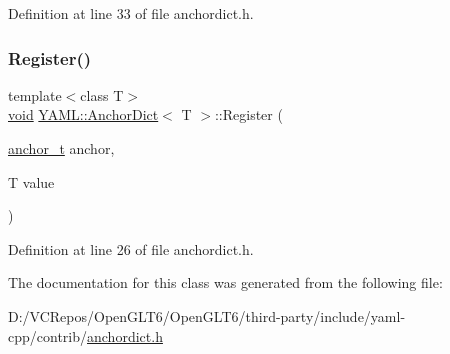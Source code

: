 Definition at line 33 of file anchordict.\+h.

\mbox{\label{class_y_a_m_l_1_1_anchor_dict_af75e353e954d3637f83773d595b3ef26}} 
\subsubsection{\texorpdfstring{Register()}{Register()}}
{\footnotesize\ttfamily template$<$class T$>$ \\
\mbox{\hyperlink{glad_8h_a950fc91edb4504f62f1c577bf4727c29}{void}} \mbox{\hyperlink{class_y_a_m_l_1_1_anchor_dict}{Y\+A\+M\+L\+::\+Anchor\+Dict}}$<$ T $>$\+::Register (\begin{DoxyParamCaption}\item[{\mbox{\hyperlink{namespace_y_a_m_l_abeff1798814ae3402fc5665fdcad1de6}{anchor\+\_\+t}}}]{anchor,  }\item[{T}]{value }\end{DoxyParamCaption})\hspace{0.3cm}{\ttfamily [inline]}}



Definition at line 26 of file anchordict.\+h.



The documentation for this class was generated from the following file\+:\begin{DoxyCompactItemize}
\item 
D\+:/\+V\+C\+Repos/\+Open\+G\+L\+T6/\+Open\+G\+L\+T6/third-\/party/include/yaml-\/cpp/contrib/\mbox{\hyperlink{anchordict_8h}{anchordict.\+h}}\end{DoxyCompactItemize}
